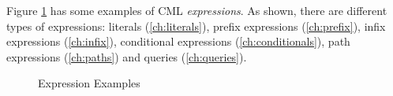 Figure \ref{fig:ex:expressions} has some examples of CML \emph{expressions}.
As shown, there are different types of expressions:
literals (\ref{ch:literals}),
prefix expressions (\ref{ch:prefix}),
infix expressions (\ref{ch:infix}),
conditional expressions (\ref{ch:conditionals}),
path expressions (\ref{ch:paths})
and queries (\ref{ch:queries}).

\begin{figure}
\verbatimfont{\small}

\caption{Expression Examples}
\label{fig:ex:expressions}
\end{figure}

